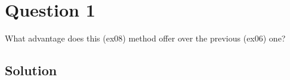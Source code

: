\section*{Question 1}

What advantage does this (ex08) method offer over the previous (ex06) one?

\subsection*{Solution}
